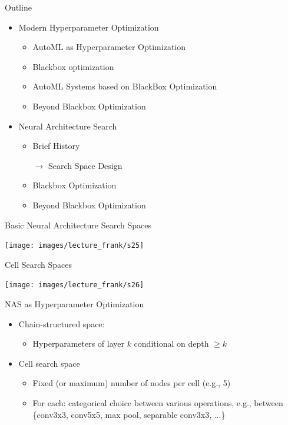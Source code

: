 \begin{frame}[c]{Outline}
\begin{itemize}
	\item Modern Hyperparameter Optimization
	\begin{itemize}
		\item AutoML as Hyperparameter Optimization
		\item Blackbox optimization
		\item AutoML Systems based on BlackBox Optimization
		\item Beyond Blackbox Optimization 
	\end{itemize}
	\item Neural Architecture Search
	\begin{itemize}
		\item Brief History
		\item[$\to$] Search Space Design
		\item Blackbox Optimization
		\item Beyond Blackbox Optimization
	\end{itemize}
\end{itemize}
\end{frame}
\begin{frame}[c]{Basic Neural Architecture Search Spaces}

{
	\texttt{[image: images/lecture\_frank/s25]}
}
\end{frame}
\begin{frame}[c]{Cell Search Spaces}

{
	\texttt{[image: images/lecture\_frank/s26]}
}
\end{frame}
\begin{frame}[c]{NAS as Hyperparameter Optimization}
\begin{itemize}
	\item Chain-structured space:
	\begin{itemize}
		\item Hyperparameters of layer $k$ conditional on depth $\geq k$
	\end{itemize}
	\item Cell search space
	\begin{itemize}
		\item Fixed (or maximum) number of nodes per cell (e.g., 5)
		\item For each: categorical choice between various operations, e.g.,
		between \{conv3x3, conv5x5, max pool, separable conv3x3, ...\}
	\end{itemize}
\end{itemize}
\end{frame}
